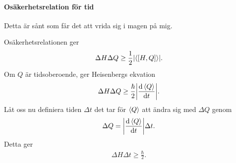 \paragraph{Osäkerhetsrelation för tid}
Detta är sånt som får det att vrida sig i magen på mig.

Osäkerhetsrelationen ger
\begin{align*}
	\Delta H\Delta Q\geq\frac{1}{2}\abs{\expval{[H, Q]}}.
\end{align*}
Om $Q$ är tidsoberoende, ger Heisenbergs ekvation
\begin{align*}
	\Delta H\Delta Q\geq\frac{\hbar}{2}\abs{\dv{\expval{Q}}{t}}.
\end{align*}
Låt oss nu definiera tiden $\Delta t$ det tar för $\expval{Q}$ att ändra sig med $\Delta Q$ genom
\begin{align*}
	\Delta Q = \abs{\dv{\expval{Q}}{t}}\Delta t.
\end{align*}
Detta ger
\begin{align*}
	\Delta H\Delta t\geq\frac{\hbar}{2}.
\end{align*}